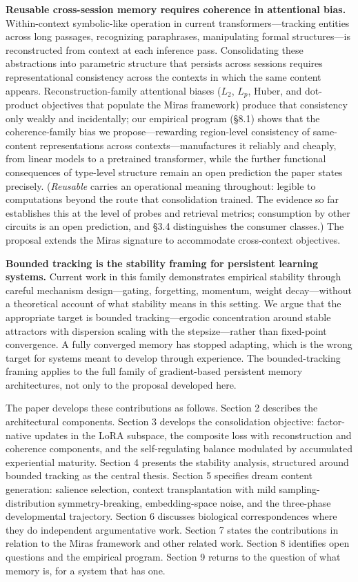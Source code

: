 \documentclass[11pt]{article}
\begin{document}
\textbf{Reusable cross-session memory requires coherence in attentional bias.} Within-context symbolic-like operation in current transformers---tracking entities across long passages, recognizing paraphrases, manipulating formal structures---is reconstructed from context at each inference pass. Consolidating these abstractions into parametric structure that persists across sessions requires representational consistency across the contexts in which the same content appears. Reconstruction-family attentional biases ($L_2$, $L_p$, Huber, and dot-product objectives that populate the Miras framework) produce that consistency only weakly and incidentally; our empirical program (\S 8.1) shows that the coherence-family bias we propose---rewarding region-level consistency of same-content representations across contexts---manufactures it reliably and cheaply, from linear models to a pretrained transformer, while the further functional consequences of type-level structure remain an open prediction the paper states precisely. (\emph{Reusable} carries an operational meaning throughout: legible to computations beyond the route that consolidation trained. The evidence so far establishes this at the level of probes and retrieval metrics; consumption by other circuits is an open prediction, and \S 3.4 distinguishes the consumer classes.) The proposal extends the Miras signature to accommodate cross-context objectives.

\textbf{Bounded tracking is the stability framing for persistent learning systems.} Current work in this family demonstrates empirical stability through careful mechanism design---gating, forgetting, momentum, weight decay---without a theoretical account of what stability means in this setting. We argue that the appropriate target is bounded tracking---ergodic concentration around stable attractors with dispersion scaling with the stepsize---rather than fixed-point convergence. A fully converged memory has stopped adapting, which is the wrong target for systems meant to develop through experience. The bounded-tracking framing applies to the full family of gradient-based persistent memory architectures, not only to the proposal developed here.

The paper develops these contributions as follows. Section 2 describes the architectural components. Section 3 develops the consolidation objective: factor-native updates in the LoRA subspace, the composite loss with reconstruction and coherence components, and the self-regulating balance modulated by accumulated experiential maturity. Section 4 presents the stability analysis, structured around bounded tracking as the central thesis. Section 5 specifies dream content generation: salience selection, context transplantation with mild sampling-distribution symmetry-breaking, embedding-space noise, and the three-phase developmental trajectory. Section 6 discusses biological correspondences where they do independent argumentative work. Section 7 states the contributions in relation to the Miras framework and other related work. Section 8 identifies open questions and the empirical program. Section 9 returns to the question of what memory is, for a system that has one.
\end{document}
